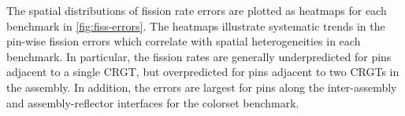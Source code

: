 The spatial distributions of fission rate errors are plotted as heatmaps for each benchmark in \autoref{fig:fiss-errors}. The heatmaps illustrate systematic trends in the pin-wise fission errors which correlate with spatial heterogeneities in each benchmark. In particular, the fission rates are generally underpredicted for pins adjacent to a single CRGT, but overpredicted for pins adjacent to two CRGTs in the assembly. In addition, the errors are largest for pins along the inter-assembly and assembly-reflector interfaces for the colorset benchmark.


